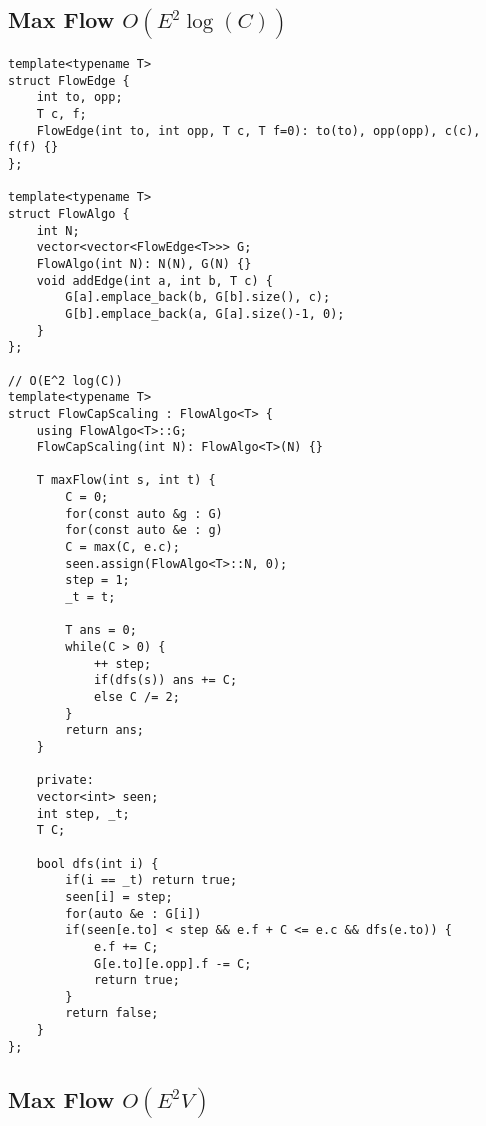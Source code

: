\documentclass[a4paper,9pt]{article}
\begin{document}
\subsection{Max Flow $O(E^2 \log(C))$}

\begin{lstlisting}
template<typename T>
struct FlowEdge {
	int to, opp;
	T c, f;
	FlowEdge(int to, int opp, T c, T f=0): to(to), opp(opp), c(c), f(f) {}
};

template<typename T>
struct FlowAlgo {
	int N;
	vector<vector<FlowEdge<T>>> G;
	FlowAlgo(int N): N(N), G(N) {}
	void addEdge(int a, int b, T c) {
		G[a].emplace_back(b, G[b].size(), c);
		G[b].emplace_back(a, G[a].size()-1, 0);
	}
};

// O(E^2 log(C))
template<typename T>
struct FlowCapScaling : FlowAlgo<T> {
	using FlowAlgo<T>::G;
	FlowCapScaling(int N): FlowAlgo<T>(N) {}
	
	T maxFlow(int s, int t) {
		C = 0;
		for(const auto &g : G)
		for(const auto &e : g)
		C = max(C, e.c);
		seen.assign(FlowAlgo<T>::N, 0);
		step = 1;
		_t = t;
		
		T ans = 0;
		while(C > 0) {
			++ step;
			if(dfs(s)) ans += C;
			else C /= 2;
		}
		return ans;
	}
	
	private:
	vector<int> seen;
	int step, _t;
	T C;
	
	bool dfs(int i) {
		if(i == _t) return true;
		seen[i] = step;
		for(auto &e : G[i])
		if(seen[e.to] < step && e.f + C <= e.c && dfs(e.to)) {
			e.f += C;
			G[e.to][e.opp].f -= C;
			return true;
		}
		return false;
	}
};
\end{lstlisting}

\subsection{Max Flow $O(E^2V)$}
\end{document}
